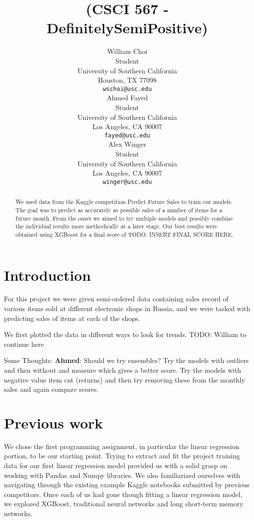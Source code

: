 \documentclass{article}
\title{(CSCI 567 - DefinitelySemiPositive)}
\author{%
  William Choi\\
  Student\\
  University of Southern California\\
  Houston, TX 77098 \\
  \texttt{wschoi@usc.edu} \\
   \And
  Ahmed Fayed\\
  Student\\
  University of Southern California\\
  Los Angeles, CA 90007 \\
  \texttt{fayed@usc.edu} \\
   \And
  Alex Winger\\
  Student\\
  University of Southern California\\
  Los Angeles, CA 90007 \\
  \texttt{winger@usc.edu} \\
}
\begin{document}
\maketitle

\begin{abstract}
We used data from the Kaggle competition Predict Future Sales to train our models. The goal was to predict as accurately as possible sales of a number of items for a future month. From the onset we aimed to try multiple models and possibly combine the individual results more methodically at a later stage. Our best results were obtained using XGBoost for a final score of TODO: INSERT FINAL SCORE HERE.
\end{abstract}

\section{Introduction}
For this project we were given semi-ordered data containing sales record of various items sold at different electronic shops in Russia, and we were tasked with predicting sales of items at each of the shops.

We first plotted the data in different ways to look for trends. TODO: William to continue here



Some Thoughts:\newline
\textbf{Ahmed}:\newline
Should we try ensembles?\newline
Try the models with outliers and then without and measure which gives a better score.\newline
Try the models with negative value item cnt (returns) and then try removing these from the monthly sales and again compare scores.\newline


\section{Previous work}

We chose the first programming assignment, in particular the linear regression portion, to be our starting point. Trying to extract and fit the project training data for our first linear regression model provided us with a solid grasp on working with Pandas and Numpy libraries. We also familiarized ourselves with navigating through the existing example Kaggle notebooks submitted by previous competitors.
Once each of us had gone though fitting a linear regression model, we explored XGBoost, traditional neural networks and long short-term memory networks.
\end{document}
